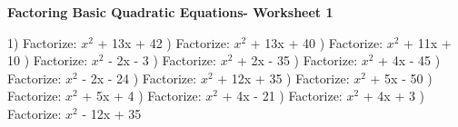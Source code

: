 \documentclass{article}%
\begin{document}
\pagebreak%
\large%
\begin{center}%
\textbf{Factoring Basic Quadratic Equations- Worksheet 1}%
\newline%
\newline%
\newline%
\end{center} \normalsize%
1) Factorize: $x^2$ + 13x + 42%
\newline%
\newline%
) Factorize: $x^2$ + 13x + 40%
\newline%
\newline%
) Factorize: $x^2$ + 11x + 10%
\newline%
\newline%
) Factorize: $x^2$ - 2x - 3%
\newline%
\newline%
) Factorize: $x^2$ + 2x - 35%
\newline%
\newline%
) Factorize: $x^2$ + 4x - 45%
\newline%
\newline%
) Factorize: $x^2$ - 2x - 24%
\newline%
\newline%
) Factorize: $x^2$ + 12x + 35%
\newline%
\newline%
) Factorize: $x^2$ + 5x - 50%
\newline%
\newline%
) Factorize: $x^2$ + 5x + 4%
\newline%
\newline%
) Factorize: $x^2$ + 4x - 21%
\newline%
\newline%
) Factorize: $x^2$ + 4x + 3%
\newline%
\newline%
) Factorize: $x^2$ - 12x + 35%
\newline%
\end{document}
